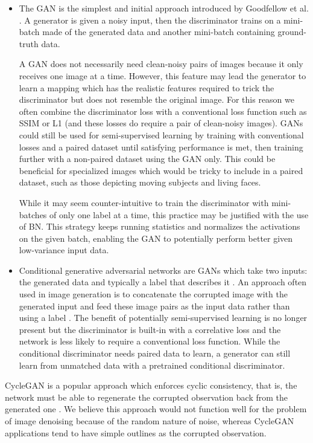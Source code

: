 \begin{itemize}
  \item The \acs{GAN} is the simplest and initial approach introduced by Goodfellow et al. \cite{gan}. A generator is given a noisy input, then the discriminator trains on a mini-batch made of the generated data and another mini-batch containing ground-truth data.

A \ac{GAN} does not necessarily need clean-noisy pairs of images because it only receives one image at a time. However, this feature may lead the generator to learn a mapping which has the realistic features required to trick the discriminator but does not resemble the original image. For this reason we often combine the discriminator loss with a conventional loss function such as SSIM or L1 (and these losses do require a pair of clean-noisy images). \acp{GAN} could still be used for semi-supervised learning by training with conventional losses and a paired dataset until satisfying performance is met, then training further with a non-paired dataset using the GAN only. This could be beneficial for specialized images which would be tricky to include in a paired dataset, such as those depicting moving subjects and living faces.

While it may seem counter-intuitive to train the discriminator with mini-batches of only one label at a time, this practice may be justified with the use of \acl{BN}. This strategy keeps running statistics and normalizes the activations on the given batch, enabling the \ac{GAN} to potentially perform better given low-variance input data. \cite{gantechniques} %
  \item Conditional generative adversarial networks are \acsp{GAN} which take two inputs: the generated data and typically a label that describes it \cite{cgan}. An approach often used in image generation is to concatenate the corrupted image with the generated input and feed these image pairs as the input data rather than using a label \cite{pix2pix}\cite{cyclegan}\cite{pix2pixhd}. The benefit of potentially semi-supervised learning is no longer present but the discriminator is built-in with a correlative loss and the network is less likely to require a conventional loss function. While the conditional discriminator needs paired data to learn, a generator can still learn from unmatched data with a pretrained conditional discriminator.
\end{itemize}
CycleGAN is a popular approach which enforces cyclic consistency, that is, the network must be able to regenerate the corrupted observation back from the generated one \cite{cyclegan}. We believe this approach would not function well for the problem of image denoising because of the random nature of noise, whereas CycleGAN applications tend to have simple outlines as the corrupted observation.

